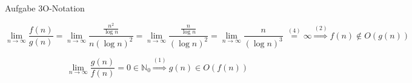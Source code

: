 \begin{frame}[allowframebreaks]{Aufgabe 3}{O-Notation}
  \begin{solutionnoinc}
    \begin{dmath*}[compact]
      \operatorname*{lim}_{n\to\infty}{\frac{f(n)}{g(n)}}
      =\operatorname*{lim}_{n\to\infty}{\frac{{\frac{n^{2}}{\log n}}}{n(\log n)^{2}}}
      =\operatorname*{lim}_{n\to\infty}{\frac{{\frac{n}{\log n}}}{(\log n)^{2}}}
      =\operatorname*{lim}_{n\to\infty}{\frac{n}{(\log n)^{3}}}\ {\overset{(4)}{=}}\infty
      \stackrel{(2)}{\Rightarrow}f(n)\notin O(g(n))
    \end{dmath*}
  \end{solutionnoinc}
  \begin{solution}
    \begin{dmath*}[compact]
      \operatorname*{lim}_{n\to\infty}{\frac{g(n)}{f(n)}}
      =0\in\mathbb{N}_{0}
      \stackrel{\left(1\right)}{\Rightarrow}g(n)\in O(f(n))
    \end{dmath*}
  \end{solution}
\end{frame}
